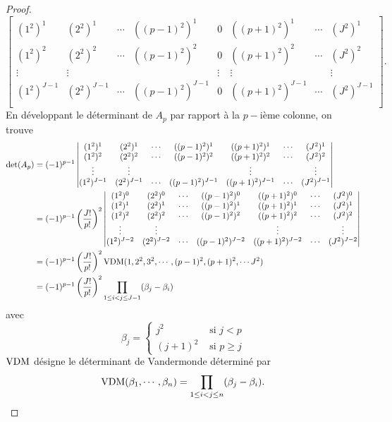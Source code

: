 \begin{proof}
\begin{equation}
\begin{bmatrix}
(1^2)^1 & (2^2)^1 & \cdots & ((p-1)^2)^1 & 0 & ((p+1)^2)^1 & \cdots & (J^2)^1 \\
(1^2)^2 & (2^2)^2 & \cdots & ((p-1)^2)^2 & 0 & ((p+1)^2)^2 & \cdots & (J^2)^2 \\
\vdots & \vdots &  &  & \vdots & \vdots &  & \vdots \\
(1^2)^{J-1} & (2^2)^{J-1} & \cdots & ((p-1)^2)^{J-1} & 0 & ((p+1)^2)^{J-1} & \cdots & (J^2)^{J-1} \\
\end{bmatrix} .
\end{equation}
En développant le déterminant de $A_p$ par rapport à la $p-$ième colonne, on trouve
\begin{align*}
\det (A_p) & = (-1)^{p-1}  \begin{vmatrix}
(1^2)^1 & (2^2)^1 & \cdots & ((p-1)^2)^1 & ((p+1)^2)^1 & \cdots & (J^2)^1 \\
(1^2)^2 & (2^2)^2 & \cdots & ((p-1)^2)^2 & ((p+1)^2)^2 & \cdots & (J^2)^2 \\
\vdots & \vdots &  &  & \vdots & & \vdots \\
(1^2)^{J-1} & (2^2)^{J-1} & \cdots & ((p-1)^2)^{J-1} & ((p+1)^2)^{J-1} & \cdots & (J^2)^{J-1} \\
\end{vmatrix} \\
	& = (-1)^{p-1} \left( \dfrac{J!}{p!} \right)^2 \begin{vmatrix}
(1^2)^0 & (2^2)^0 & \cdots & ((p-1)^2)^0 & ((p+1)^2)^0 & \cdots & (J^2)^0 \\ 
(1^2)^1 & (2^2)^1 & \cdots & ((p-1)^2)^1 & ((p+1)^2)^1 & \cdots & (J^2)^1 \\
(1^2)^2 & (2^2)^2 & \cdots & ((p-1)^2)^2 & ((p+1)^2)^2 & \cdots & (J^2)^2 \\
\vdots & \vdots &  &  & \vdots & & \vdots \\
(1^2)^{J-2} & (2^2)^{J-2} & \cdots & ((p-1)^2)^{J-2} & ((p+1)^2)^{J-2} & \cdots & (J^2)^{J-2} \\
\end{vmatrix} \\
	& = (-1)^{p-1} \left( \dfrac{J!}{p!} \right)^2 \text{VDM}(1, 2^2, 3^2, \cdots , (p-1)^2, (p+1)^2, \cdots J^2 ) \\
	& = (-1)^{p-1} \left( \dfrac{J!}{p!} \right)^2 \displaystyle\prod\limits_{1 \leq i <j \leq J-1}(\beta_j - \beta_i)
\end{align*}
avec
\begin{equation}
\beta_j = \left\lbrace
\begin{array}{cl}
j^2 & \text{ si } j < p \\
(j+1)^2 & \text{ si } p \geq j
\end{array}
\right.
\end{equation}
$\text{VDM}$ désigne le déterminant de Vandermonde \cite{Evans1976} déterminé par 
\begin{equation}
\text{VDM}(\beta_1, \cdots, \beta_n) = \displaystyle\prod\limits_{1\leq i < j \leq n} (\beta_j - \beta_i).
\end{equation}


\end{proof}
